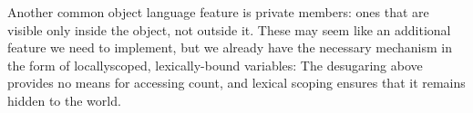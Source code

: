 
Another common object language feature is private members: ones that are visible
only inside the object, not outside it. These may seem like an additional
feature we need to implement, but we already have the necessary mechanism in the
form of locallyscoped, lexically-bound variables:
The desugaring above provides no means for accessing count, and lexical scoping
ensures that it remains hidden to the world.
